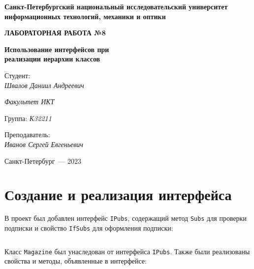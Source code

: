 \documentclass[a4paper,14pt]{extarticle}
\numberwithin{figure}{section}
\begin{document}
\begin{titlepage}
    \vspace{0pt plus2fill}
    \noindent

    \vspace{0pt plus6fill}
    \begin{center}
        \textbf{\large{Санкт-Петербургский национальный исследовательский университет информационных
                технологий, механики и оптики}}

        \vspace{0pt plus2fill}
        \textbf{\Large{ЛАБОРАТОРНАЯ РАБОТА №8}}

        \vspace{0pt plus2fill}
        \textbf{\large{Использование интерфейсов при \\ реализации иерархии классов}}
    \end{center}

    \vspace{0pt plus8fill}
    \begin{flushright}
        Студент: \\
        \textit{Швалов Даниил Андреевич}

        \textit{Факультет ИКТ}

        Группа: \textit{К32211}

        Преподаватель: \\
        \textit{Иванов Сергей Евгеньевич}
    \end{flushright}

    \vspace{0pt plus4fill}
    \begin{center}
        {Санкт-Петербург~--- 2023}
    \end{center}
\end{titlepage}

\section{Создание и реализация интерфейса}

В проект был добавлен интерфейс \texttt{IPubs}, содержащий метод \texttt{Subs} для проверки подписки и свойство \texttt{IfSubs} для оформления подписки:

\inputminted{csharp}{../MyClass/MyClass/IPubs.cs}

Класс \texttt{Magazine} был унаследован от интерфейса \texttt{IPubs}. Также были реализованы свойства и методы, объявленные в интерфейсе:
\end{document}
